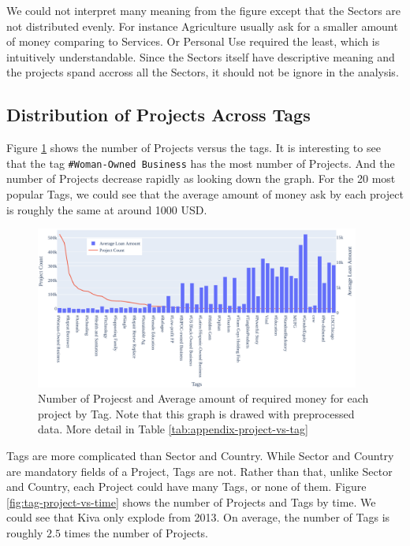 We could not interpret many meaning from the figure
except that the Sectors are not distributed evenly.
For instance Agriculture usually ask for a smaller amount of money comparing to Services.
Or Personal Use required the least, which is intuitively understandable.
Since the Sectors itself have descriptive meaning and the projects spand accross all the Sectors,
it should not be ignore in the analysis.

\subsection{Distribution of Projects Across Tags}

Figure \ref{fig:project-vs-tag} shows the number of Projects versus the \Gls{tag}s.
It is interesting to see that the tag \lstinline|#Woman-Owned Business| has the most number of Projects.
And the number of Projects decrease rapidly as looking down the graph.
For the 20 most popular Tags, we could see that the average amount of money ask by each project is roughly the same at around 1000 USD.

\begin{figure}[H]
	\centering
	\includegraphics[width=0.95\textwidth]{images/project-vs-tag.pdf}
	\caption[Number of Projects and Average amount of required money for each project by Tag]{
		Number of Projecst and Average amount of required money for each project by Tag.
		Note that this graph is drawed with preprocessed data.
		More detail in Table \ref{tab:appendix-project-vs-tag}
	}
	\label{fig:project-vs-tag}
\end{figure}

Tags are more complicated than Sector and Country.
While Sector and Country are mandatory fields of a Project, Tags are not.
Rather than that, unlike Sector and Country, each Project could have many Tags, or none of them.
Figure \ref{fig:tag-project-vs-time} shows the number of Projects and Tags by time.
We could see that Kiva only explode from 2013.
On average, the number of Tags is roughly $2.5$ times the number of Projects.

